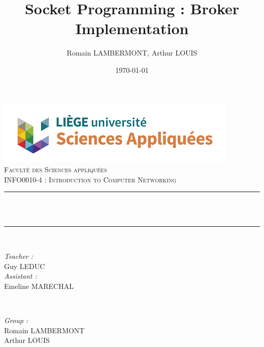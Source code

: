 \documentclass[12pt]{article}
\begin{document}

 \title{Socket Programming : Broker Implementation}								%
 \author{Romain LAMBERMONT, Arthur LOUIS}								%
 \date{\today}											%

 \makeatletter
 \let\thetitle\@title
 \let\theauthor\@author
 \let\thedate\@date
 \makeatother

 \pagestyle{fancy}
 \fancyhf{}
 \rhead{\theauthor}
 \lhead{\thetitle}
 \cfoot{\thepage}

 \begin{titlepage}
 	\centering
     \vspace*{0.5 cm}
     \includegraphics[scale = 0.7]{facsa.png}\\[1.0 cm]	%
     \textsc{\LARGE \newline\newline Faculté des Sciences appliquées}\\[2.0 cm]	%
 	\textsc{\Large  INFO0010-4 : Introduction to Computer Networking}\\[0.5 cm]				%
 	\rule{\linewidth}{0.2 mm} \\[0.4 cm]
 	{ \huge \bfseries \thetitle}\\
 	\rule{\linewidth}{0.2 mm} \\[1.5 cm]

 	\begin{minipage}{0.5\textwidth}
 		\begin{flushleft} \large
 			\emph{Teacher :}\\
 			Guy LEDUC\\
            \vspace{0.5cm}
            \emph{Assistant :}\\
            Emeline MARECHAL\\
 			\end{flushleft}
 			\end{minipage}~
 			\begin{minipage}{0.4\textwidth}

 			\begin{flushright} \large
 			\emph{Group :} \\
 			Romain LAMBERMONT\\
            Arthur LOUIS\\
 		\end{flushright}

 	\end{minipage}\\[2 cm]


     \thedate
 \end{titlepage}
\end{document}
